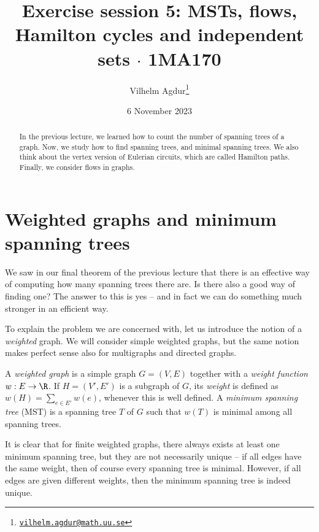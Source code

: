 \documentclass[nobib]{tufte-handout}
\title{Exercise session 5: MSTs, flows, Hamilton cycles and independent sets $\cdot$ 1MA170}
\author[Vilhelm Agdur]{Vilhelm Agdur\thanks{\href{mailto:vilhelm.agdur@math.uu.se}{\nolinkurl{vilhelm.agdur@math.uu.se}}}}
\date{6 November 2023}
\begin{document}
\maketitle%

\begin{abstract}
\noindent
In the previous lecture, we learned how to count the number of spanning trees of a graph. Now, we study how to find spanning trees, and minimal spanning trees. We also think about the vertex version of Eulerian circuits, which are called Hamilton paths. Finally, we consider flows in graphs.
\end{abstract}

\section{Weighted graphs and minimum spanning trees}

We saw in our final theorem of the previous lecture that there is an effective way of computing how many spanning trees there are. Is there also a good way of finding one? The answer to this is yes -- and in fact we can do something much stronger in an efficient way.

To explain the problem we are concerned with, let us introduce the notion of a \emph{weighted} graph. We will consider simple weighted graphs, but the same notion makes perfect sense also for multigraphs and directed graphs.

\begin{definition}
    A \emph{weighted graph} is a simple graph $G = (V,E)$ together with a \emph{weight function} $w: E \to \R$. If $H = (V', E')$ is a subgraph of $G$, its \emph{weight} is defined as $w(H) = \sum_{e\in E'} w(e)$, whenever this is well defined. A \emph{minimum spanning tree} (MST) is a spanning tree $T$ of $G$ such that $w(T)$ is minimal among all spanning trees.
\end{definition}

It is clear that for finite weighted graphs, there always exists at least one minimum spanning tree, but they are not necessarily unique -- if all edges have the same weight, then of course every spanning tree is minimal. However, if all edges are given different weights, then the minimum spanning tree is indeed unique.
\end{document}
